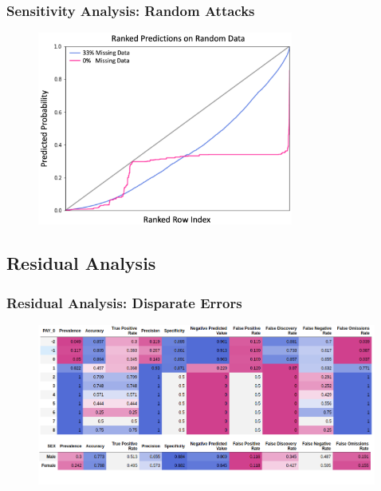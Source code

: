 \documentclass[11pt,
               aspectratio=43,
               hyperref={colorlinks}
               ]{beamer}
\begin{document}
			\begin{frame}
		
				\frametitle{\textbf{Sensitivity Analysis}: Random Attacks}
		
				\begin{figure}[htb]
					\begin{center}
						\includegraphics[height=180pt]{img/ra.png}
					\end{center}
				\end{figure}	
		
			\end{frame}
			
		\subsection{Residual Analysis}

			\begin{frame}
		
				\frametitle{\textbf{Residual Analysis}: Disparate Errors}
		
				\begin{figure}[htb]
					\begin{center}
						\includegraphics[height=150pt]{img/de.png}
					\end{center}
				\end{figure}	
		
			\end{frame}
\end{document}
